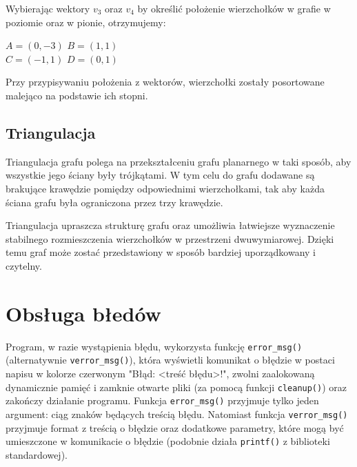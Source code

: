 \documentclass[11pt,a4paper]{article}
\begin{document}
\noindent Wybierając wektory $v_3$ oraz $v_4$ by określić położenie wierzchołków w grafie w poziomie oraz w pionie, otrzymujemy:
\begin{center}
\(A = (0, -3)\) \quad \(B = (1, 1)\) \\
\(C = (-1, 1)\) \quad \(D = (0, 1)\)
\end{center}
\noindent Przy przypisywaniu położenia z wektorów, wierzchołki zostały posortowane malejąco na podstawie ich stopni.

\subsection{Triangulacja}
Triangulacja grafu polega na przekształceniu grafu planarnego w taki sposób, aby wszystkie jego ściany były trójkątami. W tym celu do grafu dodawane są brakujące krawędzie pomiędzy odpowiednimi wierzchołkami, tak aby każda ściana grafu była ograniczona przez trzy krawędzie.

Triangulacja upraszcza strukturę grafu oraz umożliwia łatwiejsze wyznaczenie stabilnego rozmieszczenia wierzchołków w przestrzeni dwuwymiarowej. Dzięki temu graf może zostać przedstawiony w sposób bardziej uporządkowany i czytelny.

\section{Obsługa błedów}
Program, w razie wystąpienia błędu, wykorzysta funkcję \verb|error_msg()| (alternatywnie \verb|verror_msg()|), która wyświetli komunikat o błędzie w postaci napisu w kolorze czerwonym "Błąd: <treść błędu>!", zwolni zaalokowaną dynamicznie pamięć i zamknie otwarte pliki (za pomocą funkcji \verb|cleanup()|) oraz zakończy działanie programu.
Funkcja \verb|error_msg()| przyjmuje tylko jeden argument: ciąg znaków będących treścią błędu. Natomiast funkcja \verb|verror_msg()| przyjmuje format z treścią o błędzie oraz dodatkowe parametry, które mogą być umieszczone w komunikacie o błędzie (podobnie działa \verb|printf()| z biblioteki standardowej).
\end{document}
